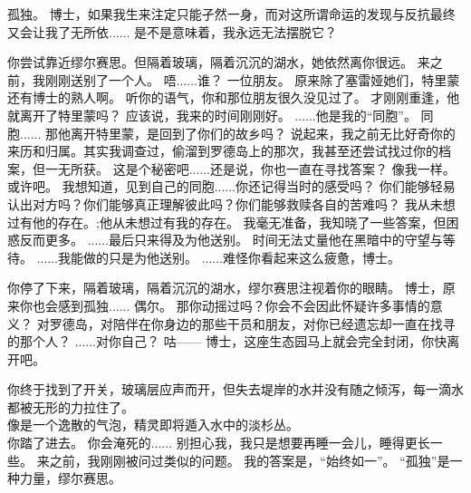 \documentclass[openany]{book}
\begin{document}
\begin{dialogue}
     孤独。
     博士，如果我生来注定只能孑然一身，而对这所谓命运的发现与反抗最终又会让我了无所依......
     是不是意味着，我永远无法摆脱它？\par
    你尝试靠近缪尔赛思。但隔着玻璃，隔着沉沉的湖水，她依然离你很远。
     来之前，我刚刚送别了一个人。
     唔......谁？
     一位朋友。
     原来除了塞雷娅她们，特里蒙还有博士的熟人啊。
     听你的语气，你和那位朋友很久没见过了。
     才刚刚重逢，他就离开了特里蒙吗？
     应该说，我来的时间刚刚好。
     ......他是我的“同胞”。
     同胞......
     那他离开特里蒙，是回到了你们的故乡吗？
     说起来，我之前无比好奇你的来历和归属。其实我调查过，偷溜到罗德岛上的那次，我甚至还尝试找过你的档案，但一无所获。
     这是个秘密吧......还是说，你也一直在寻找答案？
     像我一样。
     或许吧。
     我想知道，见到自己的同胞......你还记得当时的感受吗？
     你们能够轻易认出对方吗？你们能够真正理解彼此吗？你们能够救赎各自的苦难吗？
     我从未想过有他的存在。;他从未想过有我的存在。
     我毫无准备，我知晓了一些答案，但困惑反而更多。
     ......最后只来得及为他送别。
     时间无法丈量他在黑暗中的守望与等待。
     ......我能做的只是为他送别。
     ......难怪你看起来这么疲惫，博士。\par
    你停了下来，隔着玻璃，隔着沉沉的湖水，缪尔赛思注视着你的眼睛。
     博士，原来你也会感到孤独......
     偶尔。
     那你动摇过吗？你会不会因此怀疑许多事情的意义？
     对罗德岛，对陪伴在你身边的那些干员和朋友，对你已经遗忘却一直在找寻的那个人？
     ......对你自己？
     咕——
     博士，这座生态园马上就会完全封闭，你快离开吧。\par
    你终于找到了开关，玻璃层应声而开，但失去堤岸的水并没有随之倾泻，每一滴水都被无形的力拉住了。\\
    像是一个逸散的气泡，精灵即将遁入水中的淡杉丛。\\
    你踏了进去。
     你会淹死的......
     别担心我，我只是想要再睡一会儿，睡得更长一些。
     来之前，我刚刚被问过类似的问题。
     我的答案是，“始终如一”。
     “孤独”是一种力量，缪尔赛思。
\end{dialogue}
\end{document}
